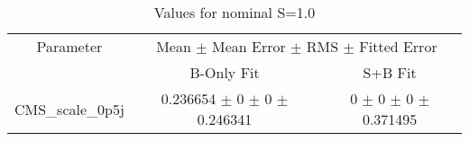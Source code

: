 \begin{table}
\centering
\caption{Values for nominal S=1.0}
\begin{tabular}{ccc}
\toprule
Parameter 	& \multicolumn{2}{c}{Mean $\pm$ Mean Error $\pm$ RMS $\pm$ Fitted Error}\\
 	& B-Only Fit & S+B Fit\\
\midrule
CMS\_scale\_0p5j 	& \num{0.236654} $\pm$ \num{0} $\pm$ \num{0} $\pm$ \num{0.246341} 	& \num{0} $\pm$ \num{0} $\pm$ \num{0} $\pm$ \num{0.371495}\\
\bottomrule
\end{tabular}
\end{table}